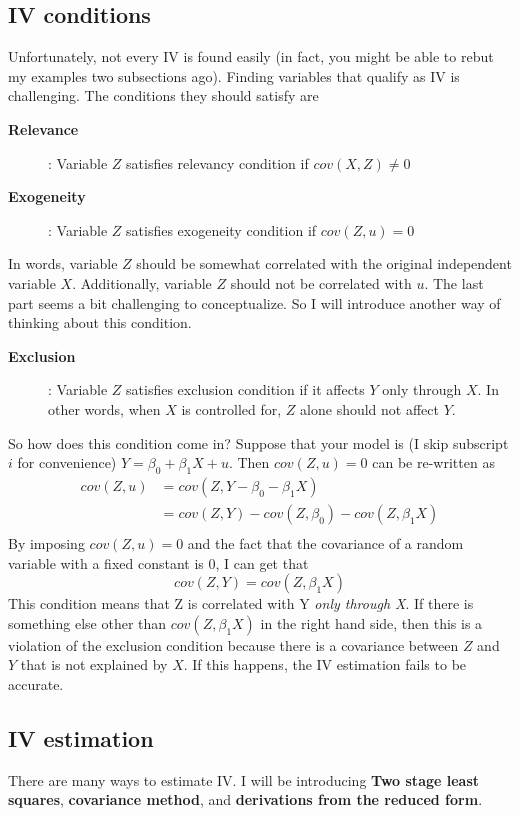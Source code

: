 \documentclass[12pt]{article}
\theoremstyle{definition}
\theoremstyle{property}
\theoremstyle{assumption}
\theoremstyle{example}
\theoremstyle{comment}
\begin{document}
\subsection{IV conditions}
Unfortunately, not every IV is found easily (in fact, you might be able to rebut my examples two subsections ago). Finding variables that qualify as IV is challenging. The conditions they should satisfy are
\begin{description}
\item[\textbf{Relevance}]: Variable $Z$ satisfies relevancy condition if $cov(X,Z)\neq0$
\item[\textbf{Exogeneity}]: Variable $Z$ satisfies exogeneity condition if $cov(Z,u)=0$
\end{description}
In words, variable $Z$ should be somewhat correlated with the original independent variable $X$. Additionally, variable $Z$ should not be correlated with $u$. The last part seems a bit challenging to conceptualize. So I will introduce another way of thinking about this condition.
\begin{description}
\item[\textbf{Exclusion}]: Variable $Z$ satisfies exclusion condition if it affects $Y$ only through $X$. In other words, when $X$ is controlled for, $Z$ alone should not affect $Y$.
\end{description}
So how does this condition come in? Suppose that your model is (I skip subscript $i$ for convenience) $Y=\beta_0+\beta_1X+u$. Then $cov(Z,u)=0$ can be re-written as
\[
\begin{aligned}
cov(Z,u)&=cov(Z,Y-\beta_0-\beta_1X)\\
&=cov(Z,Y)-cov(Z,\beta_0)-cov(Z,\beta_1X)\\
\end{aligned}
\]
By imposing $cov(Z,u)=0$ and the fact that the covariance of a random variable with a fixed constant is 0, I can get that
\[
cov(Z,Y)=cov(Z,\beta_1X)
\]
This condition means that Z is correlated with Y \textit{only through X}. If there is something else other than $cov(Z,\beta_1X)$ in the right hand side, then this is a violation of the exclusion condition because there is a covariance between $Z$ and $Y$ that is not explained by $X$. If this happens, the IV estimation fails to be accurate. 

\subsection{IV estimation}
There are many ways to estimate IV. I will be introducing \textbf{Two stage least squares}, \textbf{covariance method}, and \textbf{derivations from the reduced form}. 
\end{document}
